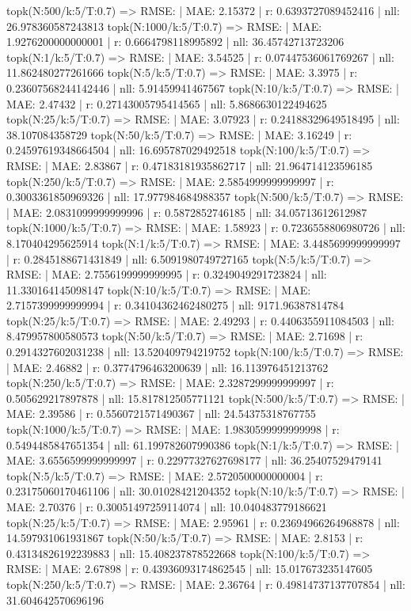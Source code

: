 topk(N:500/k:5/T:0.7) => RMSE: | MAE: 2.15372 | r: 0.6393727089452416 | nll: 26.978360587243813
topk(N:1000/k:5/T:0.7) => RMSE: | MAE: 1.9276200000000001 | r: 0.6664798118995892 | nll: 36.45742713723206
topk(N:1/k:5/T:0.7) => RMSE: | MAE: 3.54525 | r: 0.07447536061769267 | nll: 11.862480277261666
topk(N:5/k:5/T:0.7) => RMSE: | MAE: 3.3975 | r: 0.23607568244142446 | nll: 5.91459941467567
topk(N:10/k:5/T:0.7) => RMSE: | MAE: 2.47432 | r: 0.27143005795414565 | nll: 5.8686630122494625
topk(N:25/k:5/T:0.7) => RMSE: | MAE: 3.07923 | r: 0.24188329649518495 | nll: 38.107084358729
topk(N:50/k:5/T:0.7) => RMSE: | MAE: 3.16249 | r: 0.24597619348664504 | nll: 16.695787029492518
topk(N:100/k:5/T:0.7) => RMSE: | MAE: 2.83867 | r: 0.47183181935862717 | nll: 21.964714123596185
topk(N:250/k:5/T:0.7) => RMSE: | MAE: 2.5854999999999997 | r: 0.3003361850969326 | nll: 17.977984684988357
topk(N:500/k:5/T:0.7) => RMSE: | MAE: 2.0831099999999996 | r: 0.5872852746185 | nll: 34.05713612612987
topk(N:1000/k:5/T:0.7) => RMSE: | MAE: 1.58923 | r: 0.7236558806980726 | nll: 8.170404295625914
topk(N:1/k:5/T:0.7) => RMSE: | MAE: 3.4485699999999997 | r: 0.2845188671431849 | nll: 6.5091980749727165
topk(N:5/k:5/T:0.7) => RMSE: | MAE: 2.7556199999999995 | r: 0.3249049291723824 | nll: 11.330164145098147
topk(N:10/k:5/T:0.7) => RMSE: | MAE: 2.7157399999999994 | r: 0.34104362462480275 | nll: 9171.96387814784
topk(N:25/k:5/T:0.7) => RMSE: | MAE: 2.49293 | r: 0.4406355911084503 | nll: 8.479957800580573
topk(N:50/k:5/T:0.7) => RMSE: | MAE: 2.71698 | r: 0.2914327602031238 | nll: 13.520409794219752
topk(N:100/k:5/T:0.7) => RMSE: | MAE: 2.46882 | r: 0.3774796463200639 | nll: 16.113976451213762
topk(N:250/k:5/T:0.7) => RMSE: | MAE: 2.3287299999999997 | r: 0.505629217897878 | nll: 15.817812505771121
topk(N:500/k:5/T:0.7) => RMSE: | MAE: 2.39586 | r: 0.5560721571490367 | nll: 24.54375318767755
topk(N:1000/k:5/T:0.7) => RMSE: | MAE: 1.9830599999999998 | r: 0.5494485847651354 | nll: 61.199782607990386
topk(N:1/k:5/T:0.7) => RMSE: | MAE: 3.6556599999999997 | r: 0.22977327627698177 | nll: 36.25407529479141
topk(N:5/k:5/T:0.7) => RMSE: | MAE: 2.5720500000000004 | r: 0.23175060170461106 | nll: 30.01028421204352
topk(N:10/k:5/T:0.7) => RMSE: | MAE: 2.70376 | r: 0.30051497259114074 | nll: 10.040483779186621
topk(N:25/k:5/T:0.7) => RMSE: | MAE: 2.95961 | r: 0.23694966264968878 | nll: 14.597931061931867
topk(N:50/k:5/T:0.7) => RMSE: | MAE: 2.8153 | r: 0.43134826192239883 | nll: 15.408237878522668
topk(N:100/k:5/T:0.7) => RMSE: | MAE: 2.67898 | r: 0.43936093174862545 | nll: 15.017673235147605
topk(N:250/k:5/T:0.7) => RMSE: | MAE: 2.36764 | r: 0.49814737137707854 | nll: 31.604642570696196
